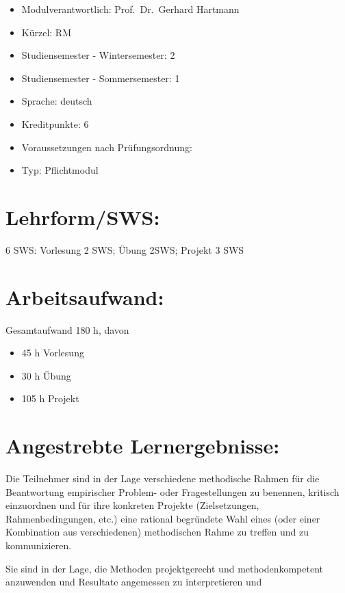 \begin{itemize}
\tightlist
\item
  Modulverantwortlich: Prof.~Dr.~Gerhard Hartmann
\item
  Kürzel: RM
\item
  Studiensemester - Wintersemester: 2
\item
  Studiensemester - Sommersemester: 1
\item
  Sprache: deutsch
\item
  Kreditpunkte: 6
\item
  Voraussetzungen nach Prüfungsordnung:
\item
  Typ: Pflichtmodul
\end{itemize}

\section*{Lehrform/SWS:}\label{lehrformsws-3}

6 SWS: Vorlesung 2 SWS; Übung 2SWS; Projekt 3 SWS

\section*{Arbeitsaufwand:}\label{arbeitsaufwand-9}

Gesamtaufwand 180 h, davon

\begin{itemize}
\tightlist
\item
  45 h Vorlesung
\item
  30 h Übung
\item
  105 h Projekt
\end{itemize}

\section*{Angestrebte
Lernergebnisse:}\label{angestrebte-lernergebnisse-3}

Die Teilnehmer sind in der Lage verschiedene methodische Rahmen für die
Beantwortung empirischer Problem- oder Fragestellungen zu benennen,
kritisch einzuordnen und für ihre konkreten Projekte (Zielsetzungen,
Rahmenbedingungen, etc.) eine rational begründete Wahl eines (oder einer
Kombination aus verschiedenen) methodischen Rahme zu treffen und zu
kommunizieren.

Sie sind in der Lage, die Methoden projektgerecht und methodenkompetent
anzuwenden und Resultate angemessen zu interpretieren und

